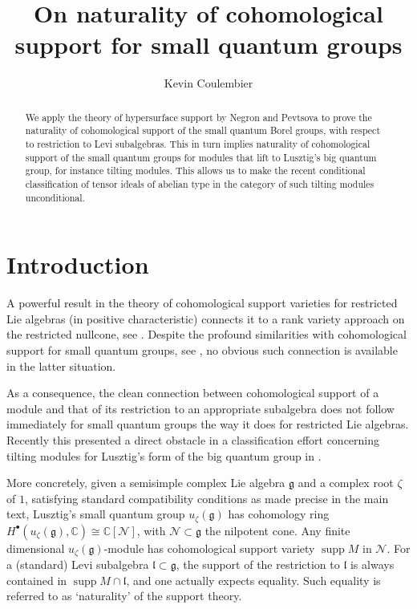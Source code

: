 \documentclass{amsart}
\title[Naturality of cohomological support]{On naturality of cohomological support for small quantum groups}
\author{Kevin Coulembier}
\numberwithin{equation}{section}
\theoremstyle{definition}
\theoremstyle{remark}
\newcommand{\cN}{\mathcal{N}}
\newcommand{\fg}{\mathfrak{g}}
\newcommand{\fl}{\mathfrak{l}}
\newcommand{\mC}{\mathbb{C}}
\newcommand{\supp}{\operatorname{supp}}
\begin{document}
\begin{abstract}
We apply the theory of hypersurface support by Negron and Pevtsova to prove the naturality of cohomological support of the small quantum Borel groups, with respect to restriction to Levi subalgebras. This in turn implies naturality of cohomological support of the small quantum groups for modules that lift to Lusztig's big quantum group, for instance tilting modules. This allows us to make the recent conditional classification of tensor ideals of abelian type in the category of such tilting modules unconditional.
\end{abstract}

\keywords{}

\subjclass[2020]{}

\maketitle



\section*{Introduction}


A powerful result in the theory of cohomological support varieties for restricted Lie algebras (in positive characteristic) connects it to a rank variety approach on the restricted nullcone, see \cite[\S 1]{FP}. Despite the profound similarities with cohomological support for small quantum groups, see \cite{GK, OsSupp, BNPP, Dr1}, no obvious such connection is available in the latter situation. 

As a consequence, the clean connection between cohomological support of a module and that of its restriction to an appropriate subalgebra does not follow immediately for small quantum groups the way it does for restricted Lie algebras. Recently this presented a direct obstacle in a classification effort concerning tilting modules for Lusztig's form of the big quantum group in \cite{CEO}.

More concretely, given a semisimple complex Lie algebra $\fg$ and a complex root $\zeta$ of $1$, satisfying standard compatibility conditions as made precise in the main text, Lusztig's small quantum group $u_\zeta(\fg)$ has cohomology ring $H^\bullet(u_\zeta(\fg),\mC)\cong\mC[\cN]$, with $\cN\subset\fg$ the nilpotent cone. Any finite dimensional $u_\zeta(\fg)$-module has cohomological support variety $\supp M$ in $\cN$. For a (standard) Levi subalgebra $\fl\subset\fg$, the support of the restriction to $\fl$ is always contained in $\supp M\cap \fl$, and one actually expects equality. Such equality is referred to as `naturality' of the support theory.
\end{document}
